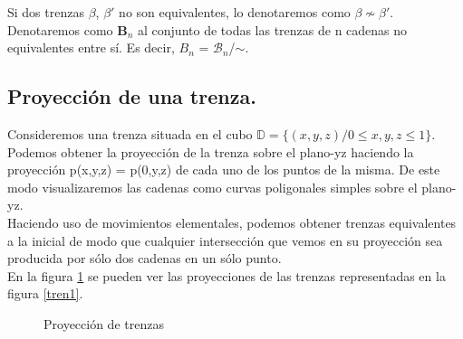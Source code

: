 Si dos trenzas $\beta$, $\beta'$ no son equivalentes, lo denotaremos como $\beta \not \sim \beta'$.\\

Denotaremos como $ \textbf{B}_{n} $ al conjunto de todas las trenzas de n cadenas no equivalentes entre sí. Es decir, ${B}_{n}$ = $\mathscr{B}_{n}$/$ \sim $.\\

\bigskip
\begin{center}
	\subsection{Proyección de una trenza.}
\end{center}
Consideremos una trenza situada en el cubo $\mathds{D} = \{(x,y,z) / 0 \leq x,y,z \leq 1\}$. Podemos obtener la proyección de la trenza sobre el plano-yz haciendo la proyección  p(x,y,z) = p(0,y,z) de cada uno de los puntos de la misma. De este modo visualizaremos las cadenas como curvas poligonales simples sobre el plano-yz.\\

Haciendo uso de movimientos elementales, podemos obtener trenzas equivalentes a la inicial de modo que cualquier intersección que vemos en su proyección sea producida por sólo dos cadenas en un sólo punto. \\ 

En la figura \ref{tren2} se pueden ver las proyecciones de las trenzas representadas en la figura \ref{tren1}.\\
\begin{figure}[h!]
	\centering
	\space
	\caption{Proyección de trenzas}
	\label{tren2} 
\end{figure} 

